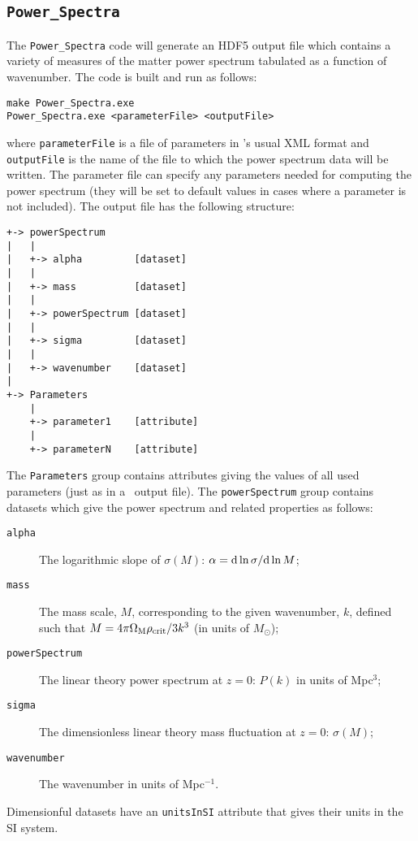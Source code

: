\subsection{{\tt Power\_Spectra}}

The {\tt Power\_Spectra} code will generate an HDF5 output file which contains a variety of measures of the matter power spectrum tabulated as a function of wavenumber. The code is built and run as follows:
\begin{verbatim}
make Power_Spectra.exe
Power_Spectra.exe <parameterFile> <outputFile>
\end{verbatim}
where {\tt parameterFile} is a file of parameters in \glc's usual XML format and {\tt outputFile} is the name of the file to which the power spectrum data will be written. The parameter file can specify any parameters needed for computing the power spectrum (they will be set to default values in cases where a parameter is not included).
The output file has the following structure:
\begin{verbatim}
+-> powerSpectrum
|   |
|   +-> alpha         [dataset]
|   |
|   +-> mass          [dataset]
|   |
|   +-> powerSpectrum [dataset]
|   |
|   +-> sigma         [dataset]
|   |
|   +-> wavenumber    [dataset]
|    
+-> Parameters
    |
    +-> parameter1    [attribute]
    |
    +-> parameterN    [attribute]
\end{verbatim}
The {\tt Parameters} group contains attributes giving the values of all used parameters (just as in a \glc\ output file). The {\tt powerSpectrum} group contains datasets which give the power spectrum and related properties as follows:
\begin{description}
\item [{\tt alpha}] The logarithmic slope of $\sigma(M)$: $\alpha = {\rm d} \ln \sigma / {\rm d} \ln M$;
\item [{\tt mass}] The mass scale, $M$, corresponding to the given wavenumber, $k$, defined such that $M=4 \pi \Omega_{\rm M} \rho_{\rm crit} / 3 k^3$ (in units of $M_\odot$);
\item [{\tt powerSpectrum}] The linear theory power spectrum at $z=0$: $P(k)$ in units of Mpc$^3$;
\item [{\tt sigma}] The dimensionless linear theory mass fluctuation at $z=0$: $\sigma(M)$;
\item [{\tt wavenumber}] The wavenumber in units of Mpc$^{-1}$.
\end{description}
Dimensionful datasets have an {\tt unitsInSI} attribute that gives their units in the SI system.
